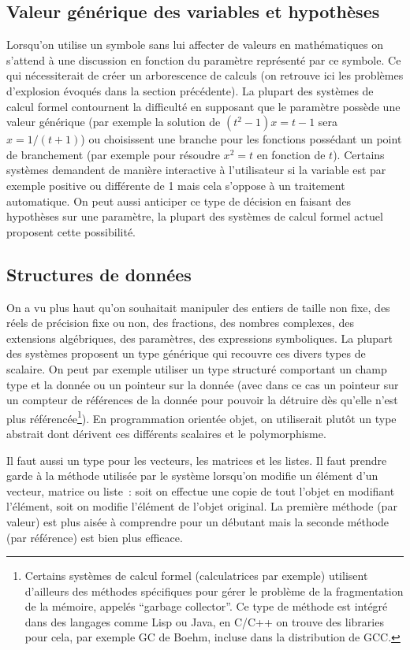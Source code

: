 \documentclass[a4paper,11pt]{article}
\begin{document}
\subsection{Valeur générique des variables et
  hypothèses} 
Lorsqu'on utilise un symbole sans lui affecter de valeurs en mathématiques 
on s'attend à une discussion en fonction du 
paramètre représenté par ce symbole. Ce qui nécessiterait de créer un 
arborescence de calculs (on retrouve ici les problèmes 
d'explosion évoqués dans la section précédente). 
La plupart des systèmes de calcul formel contournent la difficulté en 
supposant que le paramètre possède une valeur 
générique (par exemple la solution de $(t^2-1)x=t-1$ sera $x=1/(t+1)$) ou 
choisissent une branche pour les fonctions 
possédant un point de branchement (par exemple pour résoudre $x^2=t$ 
en fonction de $t$). Certains systèmes demandent de 
manière interactive à l'utilisateur si la variable est par exemple positive 
ou différente de 1 mais cela s'oppose à un 
traitement automatique. 
On peut aussi anticiper ce type de décision en faisant des hypothèses
sur une paramètre, la plupart des systèmes de calcul formel actuel
proposent cette possibilité.

\subsection{Structures de données}
On a vu plus haut qu'on souhaitait manipuler des entiers de taille non 
fixe, des réels de précision fixe ou non, des
fractions, des nombres complexes, des extensions algébriques, des 
paramètres, des expressions symboliques. La plupart des syst\`emes
proposent un type générique qui recouvre ces divers types de scalaire.
On peut par exemple utiliser un type structuré comportant un champ
type et la donnée ou un pointeur sur la donnée (avec dans ce cas un 
pointeur sur un compteur de références de la donnée
pour pouvoir la détruire dès qu'elle n'est plus référencée\footnote{Certains
systèmes de calcul formel (calculatrices par exemple) utilisent d'ailleurs des
méthodes spécifiques pour gérer le problème de la fragmentation de
la mémoire, appelés ``garbage collector''. Ce type de méthode
est intégré dans des langages comme Lisp ou Java, en C/C++ on trouve
des libraries pour cela, par exemple GC de Boehm, incluse dans la
distribution de GCC.}). 
En programmation orientée objet, on utiliserait plutôt un
type abstrait dont dérivent ces différents scalaires et le polymorphisme.

Il faut aussi un type pour les vecteurs, les matrices et les
listes. Il faut prendre garde \`a la m\'ethode utilis\'ee
par le syst\`eme lorsqu'on modifie un \'el\'ement
d'un vecteur, matrice ou liste~: soit on effectue une copie de tout
l'objet en modifiant l'\'el\'ement, soit on modifie l'\'el\'ement
de l'objet original. La premi\`ere m\'ethode (par valeur) est
plus ais\'ee \`a comprendre pour un d\'ebutant mais
la seconde m\'ethode (par r\'ef\'erence) est bien plus efficace.
\end{document}
